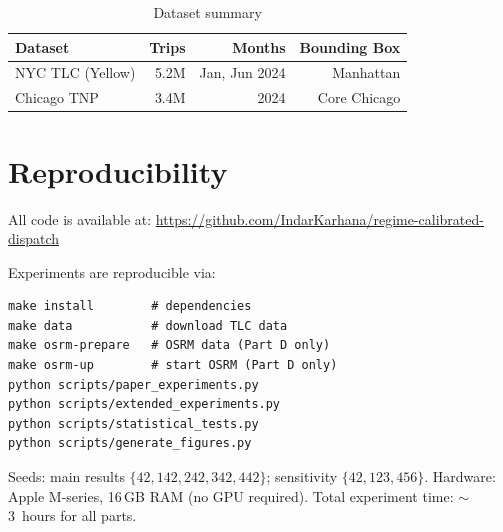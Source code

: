 \documentclass[conference,10pt]{IEEEtran}
\begin{document}
\begin{table}[h]
  \centering
  \caption{Dataset summary}
  \label{tab:datasets}
  \begin{tabular}{@{}lrrr@{}}
    \toprule
    Dataset & Trips & Months & Bounding Box \\
    \midrule
    NYC TLC (Yellow) & 5.2M & Jan, Jun 2024 & Manhattan \\
    Chicago TNP & 3.4M & 2024 & Core Chicago \\
    \bottomrule
  \end{tabular}
\end{table}


\section{Reproducibility}
\label{app:reproducibility}

All code is available at:
\url{https://github.com/IndarKarhana/regime-calibrated-dispatch}

Experiments are reproducible via:
\begin{verbatim}
make install        # dependencies
make data           # download TLC data
make osrm-prepare   # OSRM data (Part D only)
make osrm-up        # start OSRM (Part D only)
python scripts/paper_experiments.py
python scripts/extended_experiments.py
python scripts/statistical_tests.py
python scripts/generate_figures.py
\end{verbatim}

Seeds: main results $\{42, 142, 242, 342, 442\}$;
sensitivity $\{42, 123, 456\}$.
Hardware: Apple M-series, 16\,GB RAM (no GPU required).
Total experiment time: $\sim$3~hours for all parts.
\end{document}
